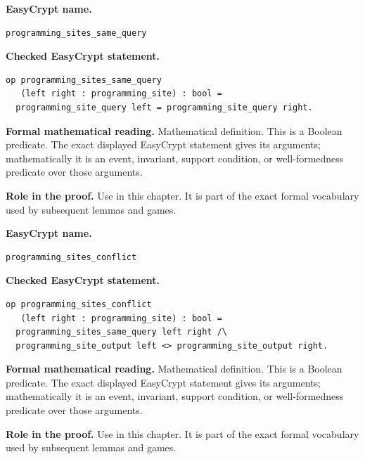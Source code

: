\begin{formaldefinition}
\noindent\textbf{EasyCrypt name.}
\begin{lstlisting}[language=EasyCrypt,basicstyle=\ttfamily\scriptsize]
programming_sites_same_query
\end{lstlisting}
\noindent\textbf{Checked EasyCrypt statement.}
\begin{lstlisting}[language=EasyCrypt,basicstyle=\ttfamily\scriptsize]
op programming_sites_same_query
   (left right : programming_site) : bool =
  programming_site_query left = programming_site_query right.
\end{lstlisting}
\noindent\textbf{Formal mathematical reading.}
Mathematical definition. This is a Boolean predicate.  The exact displayed EasyCrypt statement gives its arguments; mathematically it is an event, invariant, support condition, or well-formedness predicate over those arguments.

\noindent\textbf{Role in the proof.}
Use in this chapter. It is part of the exact formal vocabulary used by subsequent lemmas and games.

\end{formaldefinition}

\begin{formaldefinition}
\noindent\textbf{EasyCrypt name.}
\begin{lstlisting}[language=EasyCrypt,basicstyle=\ttfamily\scriptsize]
programming_sites_conflict
\end{lstlisting}
\noindent\textbf{Checked EasyCrypt statement.}
\begin{lstlisting}[language=EasyCrypt,basicstyle=\ttfamily\scriptsize]
op programming_sites_conflict
   (left right : programming_site) : bool =
  programming_sites_same_query left right /\
  programming_site_output left <> programming_site_output right.
\end{lstlisting}
\noindent\textbf{Formal mathematical reading.}
Mathematical definition. This is a Boolean predicate.  The exact displayed EasyCrypt statement gives its arguments; mathematically it is an event, invariant, support condition, or well-formedness predicate over those arguments.

\noindent\textbf{Role in the proof.}
Use in this chapter. It is part of the exact formal vocabulary used by subsequent lemmas and games.

\end{formaldefinition}

